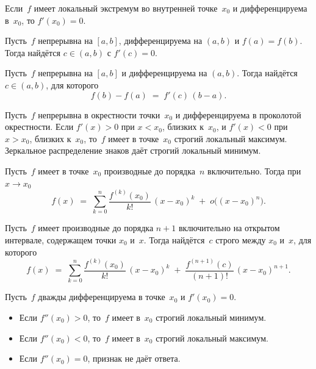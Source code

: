 \begin{theorem}[Ферма]
\label{thm:fermat}
Если~$f$ имеет локальный экстремум во внутренней точке~$x_0$ и
дифференцируема в~$x_0$, то $f'(x_0) = 0$.
\end{theorem}

\begin{theorem}[Ролль]
\label{thm:rolle}
Пусть~$f$ непрерывна на $[a, b]$, дифференцируема на $(a, b)$ и
$f(a) = f(b)$. Тогда найдётся $c \in (a, b)$ с $f'(c) = 0$.
\end{theorem}

\begin{theorem}
\label{thm:lagrange-mvt}
Пусть~$f$ непрерывна на $[a, b]$ и дифференцируема на $(a, b)$. Тогда
найдётся $c \in (a, b)$, для которого
\[
  f(b) - f(a) \;=\; f'(c)\,(b - a).
\]
\end{theorem}

\begin{theorem}
\label{thm:first-deriv-test}
Пусть~$f$ непрерывна в окрестности точки~$x_0$ и дифференцируема в
проколотой окрестности. Если $f'(x) > 0$ при $x < x_0$, близких
к~$x_0$, и $f'(x) < 0$ при $x > x_0$, близких к~$x_0$, то~$f$ имеет в
точке~$x_0$ строгий локальный максимум. Зеркальное распределение
знаков даёт строгий локальный минимум.
\end{theorem}

\begin{theorem}
\label{thm:taylor-peano}
Пусть~$f$ имеет в точке~$x_0$ производные до порядка~$n$
включительно. Тогда при $x \to x_0$
\[
  f(x) \;=\; \sum_{k=0}^{n} \frac{f^{(k)}(x_0)}{k!}\,(x - x_0)^k \;+\; o\bigl((x - x_0)^n\bigr).
\]
\end{theorem}

\begin{theorem}
\label{thm:taylor-lagrange}
Пусть~$f$ имеет производные до порядка $n+1$ включительно на открытом
интервале, содержащем точки $x_0$ и~$x$. Тогда найдётся~$c$ строго
между $x_0$ и~$x$, для которого
\[
  f(x) \;=\; \sum_{k=0}^{n} \frac{f^{(k)}(x_0)}{k!}\,(x - x_0)^k
  \;+\; \frac{f^{(n+1)}(c)}{(n+1)!}\,(x - x_0)^{n+1}.
\]
\end{theorem}

\begin{corollary}
\label{cor:second-deriv-test}
Пусть~$f$ дважды дифференцируема в точке~$x_0$ и $f'(x_0) = 0$.
\begin{itemize}
  \item Если $f''(x_0) > 0$, то~$f$ имеет в~$x_0$ строгий локальный минимум.
  \item Если $f''(x_0) < 0$, то~$f$ имеет в~$x_0$ строгий локальный максимум.
  \item Если $f''(x_0) = 0$, признак не даёт ответа.
\end{itemize}
\end{corollary}

